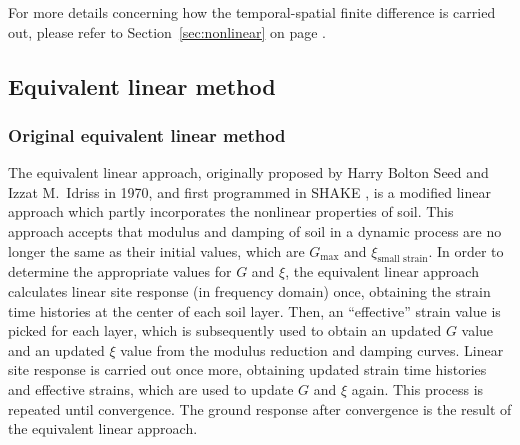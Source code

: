 \documentclass[11pt,letterpaper]{article}
\begin{document}
For more details concerning how the temporal-spatial finite difference is carried out, please refer to Section~\ref{sec:nonlinear} on page \pageref{sec:nonlinear}.


\subsection{Equivalent linear method}\label{sec:equivalent-linear}

\subsubsection{Original equivalent linear method}

The equivalent linear approach, originally proposed by Harry Bolton Seed and Izzat M.~Idriss in 1970, and first programmed in SHAKE \citep{Schnabel1972SHAKE,shake91_manual}, is a modified linear approach which partly incorporates the nonlinear properties of soil. This approach accepts that modulus and damping of soil in a dynamic process are no longer the same as their initial values, which are $G_{\text{max}}$ and $\xi_{\text{small strain}}$. In order to determine the appropriate values for $G$ and $\xi$, the equivalent linear approach calculates linear site response (in frequency domain) once, obtaining the strain time histories at the center of each soil layer. Then, an ``effective'' strain value is picked for each layer, which is subsequently used to obtain an updated $G$ value and an updated $\xi$ value from the modulus reduction and damping curves. Linear site response is carried out once more, obtaining updated strain time histories and effective strains, which are used to update $G$ and $\xi$ again.  This process is repeated until convergence. The ground response after convergence is the result of the equivalent linear approach.
\end{document}
